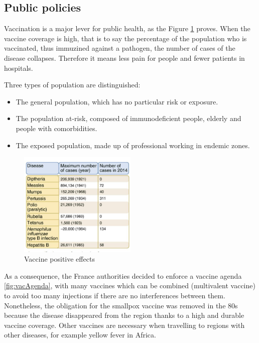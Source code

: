 \documentclass{article}
\begin{document}

        \subsection{Public policies}
 
            Vaccination is a major lever for public health, as the Figure \ref{fig:numberofcases} proves.
            When the vaccine coverage is high, that is to say the percentage of the population who is vaccinated, thus immuzined against a pathogen, 
                the number of cases of the disease collapses.
            Therefore it means less pain for people and fewer patients in hospitals.

            Three types of population are distinguished:
            \begin{itemize}
                \item The general population, which has no particular risk or exposure.
                \item The population at-risk, composed of immunodeficient people, elderly and people with comorbidities.
                \item The exposed population, made up of professional working in endemic zones.
            \end{itemize}          

            \begin{figure}
                \centering
                \includegraphics[width=0.5\textwidth]{imgs/NumberOfCases.JPG}
                \caption{Vaccine positive effects}
                \label{fig:numberofcases}
            \end{figure}

            As a consequence, the France authorities decided to enforce a vaccine agenda \ref{fig:vacAgenda}, with many vaccines
                which can be combined (multivalent vaccine) to avoid too many injections if there are no interferences between them.
            Nonetheless, the obligation for the smallpox vaccine was removed in the 80s because the disease disappeared from the region
                thanks to a high and durable vaccine coverage.
            Other vaccines are necessary when travelling to regions with other diseases, for example yellow fever in Africa.
\end{document}
